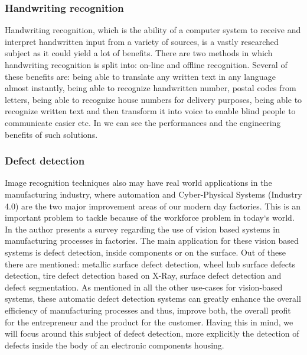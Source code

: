 \documentclass[12pt,a4paper,twoside]{report}
\begin{document}
\subsubsection{Handwriting recognition}
Handwriting recognition, which is the ability of a computer system to receive and interpret handwritten input from a variety of sources, is a vastly researched subject as it could yield a lot of benefits. There are two methods in which handwriting recognition is split into: on-line and offline recognition. Several of these benefits are: being able to translate any written text in any language almost instantly, being able to recognize handwritten number, postal codes from letters\cite{article-ciresannumere}, being able to recognize house numbers for delivery purposes\cite{article-lecunhousenr}, being able to recognize written text and then transform it into voice to enable blind people to communicate easier etc. In \cite{article-lecun} we can see the performances and the engineering benefits of such solutions. \par

\subsubsection{Defect detection}
Image recognition techniques also may have real world applications in the manufacturing industry, where automation and Cyber-Physical Systems (Industry 4.0) are the two major improvement areas of our modern day factories\cite{article-industry4}. This is an important problem to tackle because of the workforce problem in today`s world\cite{article-agingpop}. In \cite{article-fabrics} the author presents a survey regarding the use of vision based systems in manufacturing processes in factories. The main application for these vision based systems is defect detection, inside components or on the surface. Out of these there are mentioned: metallic surface defect detection\cite{article-metalsurfacelinguridet}\cite{article-mettalicsurfacedet}, wheel hub surface defects detection\cite{article-wheelhubdet}, tire defect detection based on X-Ray\cite{article-tirexraydet}, surface defect detection and defect segmentation\cite{article-detandsegmmanu}. As mentioned in all the other use-cases for vision-based systems, these automatic defect detection systems can greatly enhance the overall efficiency of manufacturing processes and thus, improve both, the overall profit for the entrepreneur and the product for the customer. Having this in mind, we will focus around this subject of defect detection, more explicitly the detection of defects inside the body of an electronic components housing.
\end{document}
